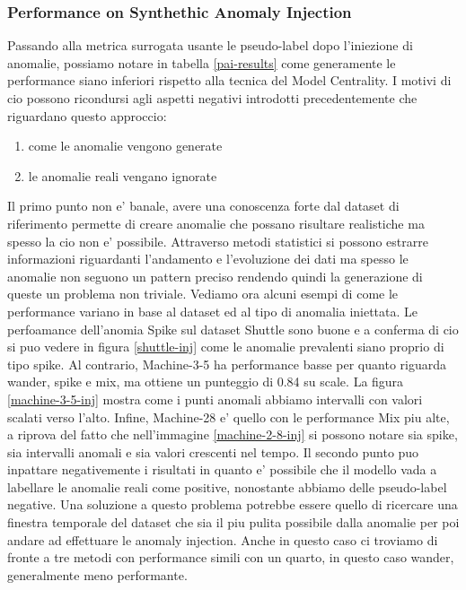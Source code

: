 \newpage
\subsubsection{Performance on Synthethic Anomaly Injection}
Passando alla metrica surrogata usante le pseudo-label dopo l'iniezione di anomalie, possiamo notare in tabella \ref{pai-results} come generamente le performance siano inferiori rispetto alla tecnica del Model Centrality. I motivi di cio possono ricondursi agli aspetti negativi introdotti precedentemente che riguardano questo approccio: 
\begin{enumerate}
	\item come le anomalie vengono generate
	\item le anomalie reali vengano ignorate
\end{enumerate}
Il primo punto non e' banale, avere una conoscenza forte dal dataset di riferimento permette di creare anomalie che possano risultare realistiche ma spesso la cio non e' possibile. Attraverso metodi statistici si possono estrarre informazioni riguardanti l'andamento e l'evoluzione dei dati ma spesso le anomalie non seguono un pattern preciso rendendo quindi la generazione di queste un problema non triviale. 
Vediamo ora alcuni esempi di come le performance variano in base al dataset ed al tipo di anomalia iniettata. Le perfoamance dell'anomia Spike sul dataset Shuttle sono buone e a conferma di cio si puo vedere in figura \ref{shuttle-inj} come le anomalie prevalenti siano proprio di tipo spike.
Al contrario, Machine-3-5 ha performance basse per quanto riguarda wander, spike e mix, ma ottiene un punteggio di 0.84 su scale. La figura \ref{machine-3-5-inj} mostra come i punti anomali abbiamo intervalli con valori scalati verso l'alto. Infine, Machine-28 e' quello con le performance Mix piu alte, a riprova del fatto che nell'immagine \ref{machine-2-8-inj} si possono notare sia spike, sia intervalli anomali e sia valori crescenti nel tempo.
Il secondo punto puo inpattare negativemente i risultati in quanto e' possibile che il modello vada a labellare le anomalie reali come positive, nonostante abbiamo delle pseudo-label negative. Una soluzione a questo problema potrebbe essere quello di ricercare una finestra temporale del dataset che sia il piu pulita possibile dalla anomalie per poi andare ad effettuare le anomaly injection.
Anche in questo caso ci troviamo di fronte a tre metodi con performance simili con un quarto, in questo caso wander, generalmente meno performante.

